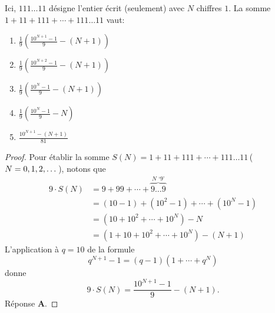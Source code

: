% 
%
Ici, $111\dots 11$ désigne l'entier écrit (seulement) avec $N$ chiffres $1$. La somme $1 + 11 + 111 + \cdots + 111\dots 11$ %
vaut:
%
\begin{enumerate}
  \item $\frac{1}{9}\!\left(\frac{10^{N+1}-1}{9} - (N+1)\right)$
  \item $\frac{1}{9}\!\left(\frac{10^{N+2}-1}{9} - (N+1)\right)$
  \item $\frac{1}{9}\!\left(\frac{10^{N}-1}{9} - (N+1)\right)$
  \item $\frac{1}{9}\!\left(\frac{10^{N}-1}{9} - N\right)$
  \item $\frac{10^{N+1}-(N+1)}{81}$
\end{enumerate}
%
\begin{proof}
Pour établir la somme $S(N) = 1 + 11 + 111 + \cdots + 111\dots 11$\;\,($N=0, 1, 2, \dots$), notons que  
%
\begin{align}
  9 \cdot S(N) & = 9 + 99 + \cdots + \overbrace{9 \dots 9}^{N \text{ `$9$'}} \\
  & = (10-1) + (10^2 - 1) + \cdots + (10^N - 1) \\
  & = (10 + 10^2 + \cdots + 10^N) - N \\
  & = (1 + 10 + 10^2 + \cdots + 10^N) - (N + 1)
\end{align}
%
L'application à $q=10$ de la formule 
%
\begin{equation}
  q^{N+1} - 1  = (q-1)(1 + \cdots + q^N)
\end{equation} 
%
donne 
% 
\begin{equation}
  9 \cdot S(N) = \frac{10^{N+1} - 1}{9} - (N+1).
\end{equation}
%
Réponse \textbf{A}.
\end{proof}